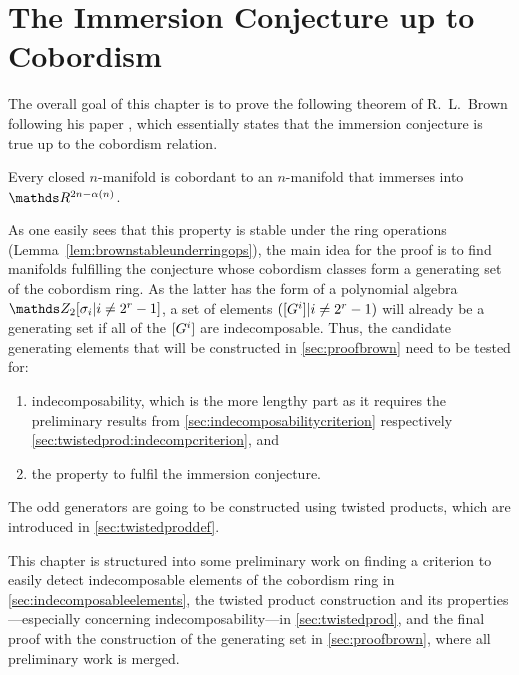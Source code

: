 % 

\chapter{The Immersion Conjecture up to Cobordism}\label{chap:brown}
The overall goal of this chapter is to prove the following theorem of
R.~L.~Brown following his paper \cite{brown},
which essentially states that the immersion conjecture is true up to
the cobordism relation.
\begin{Thm}[Brown]\label{thm:brown}
  Every closed $n$-manifold is cobordant to an $n$-manifold that immerses
  into $\R^{2n-\alpha(n)}$.
\end{Thm}

As one easily sees that this property is stable under
the ring operations (Lemma~\ref{lem:brownstableunderringops}),
the main idea for the proof is to find manifolds
fulfilling the conjecture whose cobordism classes form a generating set
of the cobordism ring.
As the latter has the form of a polynomial algebra
$\Zmod2[\sigma_i|i\neq 2^r-1]$, a set of elements
$([G^{i}]|i\neq2^r-1)$ will already be a generating set if all of the
$[G^{i}]$ are indecomposable.
Thus, the candidate generating elements that will be constructed
in \autoref{sec:proofbrown} need to be tested for:
\begin{enumerate}
\item indecomposability, which is the more lengthy part as it
  requires the preliminary results from
  \autoref{sec:indecomposabilitycriterion} respectively
  \autoref{sec:twistedprod:indecompcriterion}, and
\item the property to fulfil the immersion conjecture.
\end{enumerate}
The odd generators are going to be constructed using twisted
products, which are introduced in \autoref{sec:twistedproddef}.

This chapter is structured into some preliminary work on finding a
criterion to easily detect indecomposable elements of the cobordism
ring in \autoref{sec:indecomposableelements},
the twisted product construction and its properties---especially
concerning indecomposability---in
\autoref{sec:twistedprod}, and the final proof with the construction
of the generating set in \autoref{sec:proofbrown}, where all
preliminary work is merged.

